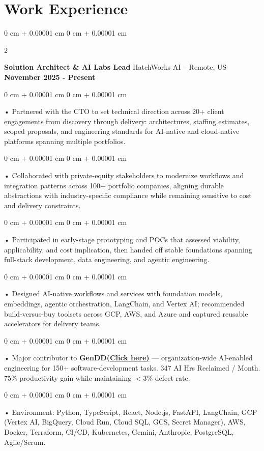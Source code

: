 \documentclass[10pt, letterpaper]{article}
\newenvironment{onecolentry}{
    \begin{adjustwidth}{
        0 cm + 0.00001 cm
    }{
        0 cm + 0.00001 cm
    }
}{
    \end{adjustwidth}
} %
\newenvironment{twocolentry}[2][]{
    \onecolentry
    \def\secondColumn{#2}
    \setcolumnwidth{\fill, 4.5 cm}
    \begin{paracol}{2}
}{
    \switchcolumn \raggedleft \secondColumn
    \end{paracol}
    \endonecolentry
} %
\begin{document}
    \vspace{0.5cm}
    \section{Work Experience}
        \vspace{0.1cm}

        \begin{twocolentry}{
            \textbf{November 2025 - Present}
        }
            \textbf{Solution Architect \& AI Labs Lead} HatchWorks AI -- Remote, US\end{twocolentry}

        \begin{onecolentry}
             • Partnered with the CTO to set technical direction across 20+ client engagements from discovery through delivery: architectures, staffing estimates, scoped proposals, and engineering standards for AI-native and cloud-native platforms spanning multiple portfolios.
        \end{onecolentry}
        \begin{onecolentry}
             • Collaborated with private-equity stakeholders to modernize workflows and integration patterns across 100+ portfolio companies, aligning durable abstractions with industry-specific compliance while remaining sensitive to cost and delivery constraints.
        \end{onecolentry}
        \begin{onecolentry}
             • Participated in early-stage prototyping and POCs that assessed viability, applicability, and cost implication, then handed off stable foundations spanning full-stack development, data engineering, and agentic engineering.
        \end{onecolentry}
        \begin{onecolentry}
             • Designed AI-native workflows and services with foundation models, embeddings, agentic orchestration, LangChain, and Vertex AI; recommended build-versus-buy toolsets across GCP, AWS, and Azure and captured reusable accelerators for delivery teams.
        \end{onecolentry}
        \begin{onecolentry}
             • Major contributor to \textbf{GenDD}\href{https://hatchworks.com/generative-driven-development/}{\textbf{(Click here)}} --- organization-wide AI-enabled engineering for 150+ software-development tasks. 347 AI Hrs Reclaimed / Month. 75\% productivity gain while maintaining $<$3\% defect rate.
        \end{onecolentry}
        \begin{onecolentry}
             • Environment: Python, TypeScript, React, Node.js, FastAPI, LangChain, GCP (Vertex AI, BigQuery, Cloud Run, Cloud SQL, GCS, Secret Manager), AWS, Docker, Terraform, CI/CD, Kubernetes, Gemini, Anthropic, PostgreSQL, Agile/Scrum.
        \end{onecolentry}
\end{document}
